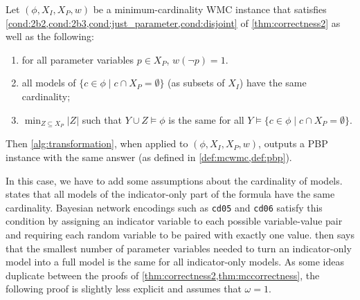 \begin{theorem}\label{thm:mccorrectness}
  Let $(\phi, X_I, X_P, w)$ be a minimum-cardinality WMC instance that satisfies
  \cref{cond:2b2,cond:2b3,cond:just_parameter,cond:disjoint} of
  \cref{thm:correctness2} as well as the following:
  \begin{enumerate}
  \item for all parameter variables $p \in X_P$, $w(\neg p) = 1$.
  \item all models of $\{ c \in \phi \mid c \cap X_P = \emptyset \}$ (as subsets
    of $X_I$) have the same cardinality; \label{cond:22}
  \item $\min_{Z \subseteq X_P} |Z|$ such that $Y \cup Z \models \phi$ is the
    same for all $Y \models \{ c \in \phi \mid c \cap X_P = \emptyset
    \}$. \label{cond:23}
  \end{enumerate}
  Then \cref{alg:transformation}, when applied to $(\phi, X_I, X_P, w)$, outputs
  a PBP instance with the same answer (as defined in \cref{def:mcwmc,def:pbp}).
\end{theorem}

In this case, we have to add some assumptions about the cardinality of models.
 states that all models of the indicator-only part of the formula
have the same cardinality. Bayesian network encodings such as \texttt{cd05} and
\texttt{cd06} satisfy this condition by assigning an indicator variable to each
possible variable-value pair and requiring each random variable to be paired
with exactly one value.  then says that the smallest number of
parameter variables needed to turn an indicator-only model into a full model is
the same for all indicator-only models. As some ideas duplicate between the
proofs of \cref{thm:correctness2,thm:mccorrectness}, the following proof is
slightly less explicit and assumes that $\omega = 1$.

